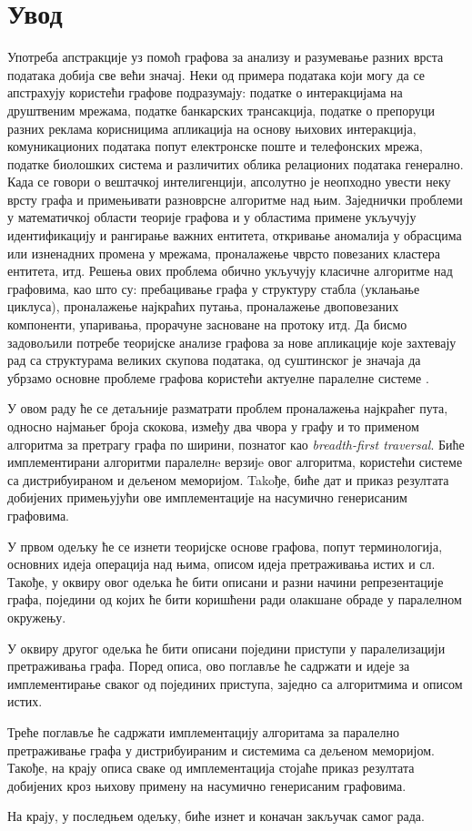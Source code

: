 \chapter*{Увод}
Употреба апстракције уз помоћ графова за анализу и разумевање разних врста података добија све већи значај. Неки од примера података који могу да се апстрахују користећи графове подразумају: податке о интеракцијама на друштвеним мрежама, податке банкарских трансакција, податке о препоруци разних реклама корисницима апликација на основу њихових интеракција, комуникационих података попут електронске поште и телефонских мрежа, податке биолошких система и различитих облика релационих података генерално. Када се говори о вештачкој интелигенцији, апсолутно је неопходно увести неку врсту графа и примењивати разноврсне алгоритме над њим. Заједнички проблеми у математичкој области теорије графова и у областима примене укључују идентификацију и рангирање важних ентитета, откривање аномалија у обрасцима или изненадних промена у мрежама, проналажење чврсто повезаних кластера ентитета, итд. Решења ових проблема обично укључују класичне алгоритме над графовима, као што су: пребацивање графа у структуру стабла (уклањање циклуса), проналажење најкраћих путања, проналажење двоповезаних компоненти, упаривања, прорачуне засноване на протоку итд. Да бисмо задовољили потребе теоријске анализе графова за нове апликације које захтевају рад са структурама великих скупова података, од суштинског је значаја да убрзамо основне проблеме графова користећи актуелне паралелне системе \cite{graphs-big-data}.

\par
У овом раду ће се детаљније разматрати проблем проналажења најкраћег пута, односно најмањег броја скокова, између два чвора у графу и то применом алгоритма за претрагу графа по ширини, познатог као \textit{breadth-first traversal}. Биће имплементирани алгоритми паралелнe верзијe овог алгоритма, користећи системе са дистрибуираном и дељеном меморијом. Takoђе, биће дат и приказ резултата добијених примењујући ове имплементације на насумично генерисаним графовима.

\par
У првом одељку ће се изнети теоријске основе графова, попут терминологија, основних идеја операција над њима, описом идеја претраживања истих и сл. Такође, у оквиру овог одељка ће бити описани и разни начини репрезентације графа, поједини од којих ће бити коришћени ради олакшане обраде у паралелном окружењу.

\par
У оквиру другог одељка ће бити описани поједини приступи у паралелизацији претраживања графа. Поред описа, ово поглавље ће садржати и идеје за имплементирање сваког од појединих приступа, заједно са алгоритмима и описом истих. 

\par
Треће поглавље ће садржати имплементацију алгоритама за паралелно претраживање графа у дистрибуираним и системима са дељеном меморијом. Такође, на крају описа сваке од имплементација стојаће приказ резултата добијених кроз њихову примену на насумично генерисаним графовима.

\par
На крају, у последњем одељку, биће изнет и коначан закључак самог рада.